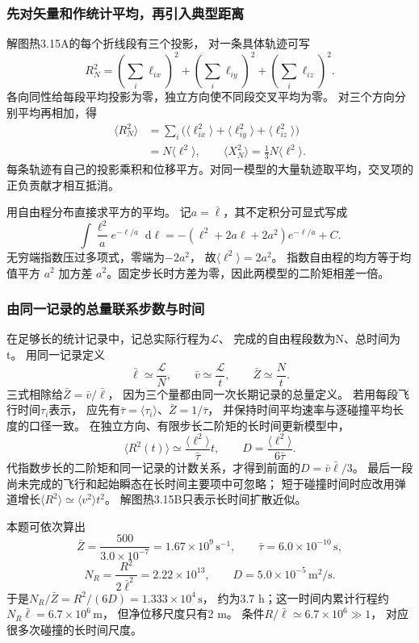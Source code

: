 \documentclass[UTF8,fontset=fandol,a4paper,11pt]{ctexart}
\newcommand{\dd}{\mathop{}\!\mathrm{d}}
\begin{document}
\subsubsection*{先对矢量和作统计平均，再引入典型距离}
解图热3.15A的每个折线段有三个投影，
对一条具体轨迹可写
\[
R_N^2=\left(\sum_i\ell_{ix}\right)^2+
\left(\sum_i\ell_{iy}\right)^2+
\left(\sum_i\ell_{iz}\right)^2.
\]
各向同性给每段平均投影为零，独立方向使不同段交叉平均为零。
对三个方向分别平均再相加，得
\[
\begin{aligned}
\langle R_N^2\rangle
&=\sum_i\bigl(\langle\ell_{ix}^2\rangle+
\langle\ell_{iy}^2\rangle+\langle\ell_{iz}^2\rangle\bigr)\\
&=N\langle\ell^2\rangle,\qquad
\langle X_N^2\rangle=\frac13N\langle\ell^2\rangle.
\end{aligned}
\]
每条轨迹有自己的投影乘积和位移平方。对同一模型的大量轨迹取平均，交叉项的正负贡献才相互抵消。

用自由程分布直接求平方的平均。
记$a=\bar\ell$，其不定积分可显式写成
\[
\int\frac{\ell^2}{a}e^{-\ell/a}\dd\ell
=-(\ell^2+2a\ell+2a^2)e^{-\ell/a}+C.
\]
无穷端指数压过多项式，零端为$-2a^2$，
故$\langle\ell^2\rangle=2a^2$。
指数自由程的均方等于均值平方 $a^2$ 加方差 $a^2$。固定步长时方差为零，因此两模型的二阶矩相差一倍。

\subsubsection*{由同一记录的总量联系步数与时间}
在足够长的统计记录中，记总实际行程为$\mathcal L$、
完成的自由程段数为N、总时间为t。
用同一记录定义
\[
\bar\ell\simeq\frac{\mathcal L}{N},\qquad
\bar v\simeq\frac{\mathcal L}{t},\qquad
\bar Z\simeq\frac Nt.
\]
三式相除给$\bar Z=\bar v/\bar\ell$，
因为三个量都由同一次长期记录的总量定义。
若用每段飞行时间$\tau_i$表示，
应先有$\bar\tau=\langle\tau_i\rangle$、$\bar Z=1/\bar\tau$，
并保持时间平均速率与逐碰撞平均长度的口径一致。
在独立方向、有限步长二阶矩的长时间更新模型中，
\[
\langle R^2(t)\rangle\simeq
\frac{\langle\ell^2\rangle}{\bar\tau}t,\qquad
D=\frac{\langle\ell^2\rangle}{6\bar\tau}.
\]
代指数步长的二阶矩和同一记录的计数关系，才得到前面的$D=\bar v\bar\ell/3$。
最后一段尚未完成的飞行和起始瞬态在长时间主要项中可忽略；
短于碰撞时间时应改用弹道增长$\langle R^2\rangle\simeq\langle v^2\rangle t^2$。
解图热3.15B只表示长时间扩散近似。

本题可依次算出
\[
\bar Z=\frac{500}{3.0\times10^{-7}}
=1.67\times10^9\,\mathrm{s^{-1}},\qquad
\bar\tau=6.0\times10^{-10}\,\mathrm s,
\]
\[
N_R=\frac{R^2}{2\bar\ell^2}=2.22\times10^{13},\qquad
D=5.0\times10^{-5}\,\mathrm{m^2/s}.
\]
于是$N_R/\bar Z=R^2/(6D)=1.333\times10^4\,\mathrm s$，
约为3.7 h；这一时间内累计行程约$N_R\bar\ell=6.7\times10^6\,\mathrm m$，
但净位移尺度只有2 m。
条件$R/\bar\ell\simeq6.7\times10^6\gg1$，
对应很多次碰撞的长时间尺度。
\end{document}

